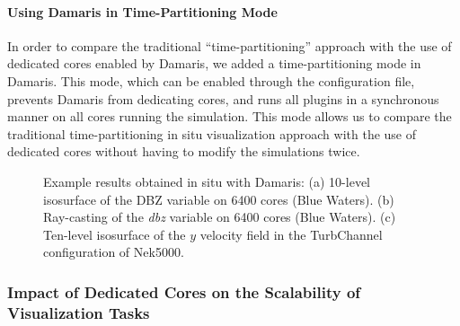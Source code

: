 \paragraph{Using Damaris in Time-Partitioning Mode} In order to
compare the traditional ``time-partitioning'' approach with the use of dedicated
cores enabled by Damaris, we added a time-partitioning mode in Damaris. This mode,
which can be enabled through the configuration file, prevents Damaris from
dedicating cores, and runs all plugins in a synchronous manner on all cores
running the simulation. This mode allows us to compare the traditional time-partitioning
in situ visualization approach with the use of dedicated cores without having to modify the simulations
twice.

\begin{figure}[t]
\centering
	
	\caption{Example results obtained in situ with Damaris:
	(a) 10-level isosurface of the DBZ variable on 6400 cores (Blue Waters).
	(b) Ray-casting of the \emph{dbz} variable on 6400 cores (Blue Waters).
	(c) Ten-level isosurface of the $y$ velocity field in 
	the TurbChannel configuration of Nek5000.}\label{fig:visualresults}
\end{figure}

\subsubsection{Impact of Dedicated Cores on the Scalability of Visualization Tasks}

